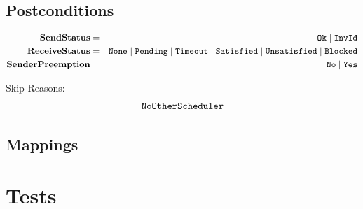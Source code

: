 \subsection{Postconditions}

\begin{eqnarray*}
   \mathbf{SendStatus} &=& \mathtt{Ok} \mid \mathtt{InvId}
\\ \mathbf{ReceiveStatus} &=& \mathtt{None} \mid \mathtt{Pending} \mid \mathtt{Timeout} \mid \mathtt{Satisfied} \mid \mathtt{Unsatisfied}
   \mid \mathtt{Blocked}
\\ \mathbf{SenderPreemption} &=& \mathtt{No} \mid \mathtt{Yes}
\end{eqnarray*}

Skip Reasons:
\begin{eqnarray*}
  \mathtt{NoOtherScheduler}
\end{eqnarray*}

\subsection{Mappings}


\section{Tests}
